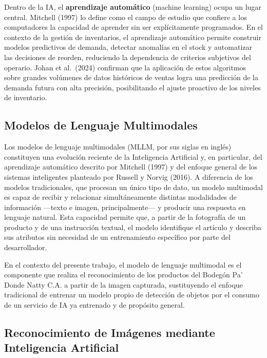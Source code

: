 \documentclass[12pt, letterpaper]{report}
\begin{document}
Dentro de la IA, el \textbf{aprendizaje automático} (machine learning)
ocupa un lugar central. Mitchell (1997) lo define como el campo de
estudio que confiere a los computadores la capacidad de aprender sin
ser explícitamente programados. En el contexto de la gestión de
inventarios, el aprendizaje automático permite construir modelos
predictivos de demanda, detectar anomalías en el stock y automatizar
las decisiones de reorden, reduciendo la dependencia de criterios
subjetivos del operario. Johan et al.\ (2024) confirman que la
aplicación de estos algoritmos sobre grandes volúmenes de datos
históricos de ventas logra una predicción de la demanda futura con
alta precisión, posibilitando el ajuste proactivo de los niveles de
inventario.

\subsection{Modelos de Lenguaje Multimodales}

Los modelos de lenguaje multimodales (MLLM, por sus siglas en inglés)
constituyen una evolución reciente de la Inteligencia Artificial y, en
particular, del aprendizaje automático descrito por Mitchell (1997) y
del enfoque general de los sistemas inteligentes planteado por Russell
y Norvig (2016). A diferencia de los modelos tradicionales, que
procesan un único tipo de dato, un modelo multimodal es capaz de
recibir y relacionar simultáneamente distintas modalidades de
información ---texto e imagen, principalmente--- y producir una
respuesta en lenguaje natural. Esta capacidad permite que, a partir de
la fotografía de un producto y de una instrucción textual, el modelo
identifique el artículo y describa sus atributos sin necesidad de un
entrenamiento específico por parte del desarrollador.

En el contexto del presente trabajo, el modelo de lenguaje multimodal
es el componente que realiza el reconocimiento de los productos del
Bodegón Pa' Donde Natty C.A. a partir de la imagen capturada,
sustituyendo el enfoque tradicional de entrenar un modelo propio de
detección de objetos por el consumo de un servicio de IA ya entrenado
y de propósito general.

\subsection{Reconocimiento de Imágenes mediante Inteligencia Artificial}
\end{document}
